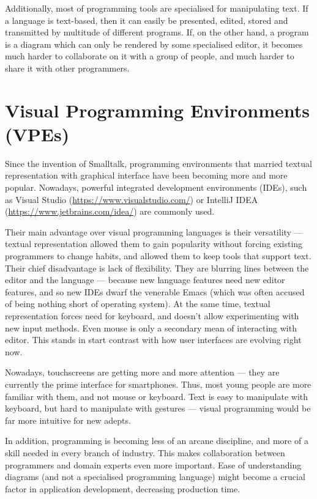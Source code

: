 \documentclass[english,mgr,shortabstract]{iithesis}
\begin{document}
Additionally, most of programming tools are specialised for manipulating text.
If a language is text-based, then it can easily be presented, edited, stored and
transmitted by multitude of different programs. If, on the other hand, a program
is a diagram which can only be rendered by some specialised editor, it becomes
much harder to collaborate on it with a group of people, and much harder to
share it with other programmers.

\section{Visual Programming Environments (VPEs)}
Since the invention of Smalltalk, programming environments that married textual
representation with graphical interface have been becoming more and more
popular.
Nowadays, powerful integrated development environments (IDEs), such as Visual
Studio (\url{https://www.visualstudio.com/}) or IntelliJ IDEA
(\url{https://www.jetbrains.com/idea/}) are commonly used.

Their main advantage over visual programming languages is their versatility ---
textual representation allowed them to gain popularity without forcing existing
programmers to change habits, and allowed them to keep tools that support text.
Their chief disadvantage is lack of flexibility. They are blurring lines between
the editor and the language ---
because new language features need new editor features, and so new IDEs dwarf
the venerable
Emacs (which was often accused of being nothing short of operating system).
At the same time, textual representation forces need for keyboard, and doesn't
allow experimenting with new input methods. Even mouse is only a secondary mean
of interacting with editor. This stands in start contrast with how user
interfaces are evolving right now.

Nowadays, touchscreens are getting more and more attention --- they are currently
the prime interface for smartphones.
Thus, most young people are more familiar with them, and not mouse or keyboard.
Text is easy to manipulate with keyboard, but hard to manipulate with gestures ---
visual programming would be far more intuitive for new adepts.

In addition, programming is becoming less of an arcane discipline, and more of
a skill needed in every branch of industry.
This makes collaboration between programmers and domain experts even more
important.
Ease of understanding diagrams (and not a specialised programming language) might become a
crucial factor in application development, decreasing production time.
\end{document}
